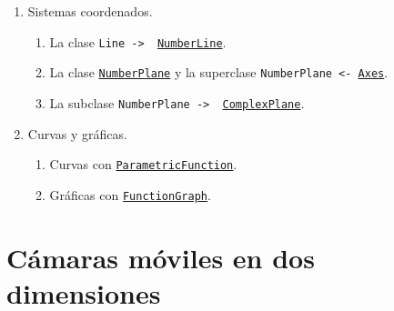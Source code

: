 \documentclass[a4paper]{article}
\begin{document}
\begin{enumerate}
    \item Sistemas coordenados.
    \begin{enumerate}[label=3.\arabic*]

        \item La clase \texttt{Line -> \ \href{https://docs.manim.community/en/v0.16.0.post0/reference/manim.mobject.graphing.number_line.NumberLine.html?highlight=NumberLine}{NumberLine}}.

        \item La clase \texttt{\href{https://docs.manim.community/en/v0.16.0.post0/reference/manim.mobject.graphing.coordinate_systems.NumberPlane.html?highlight=NumberPlane}{NumberPlane}} y la superclase \texttt{NumberPlane <- \href{https://docs.manim.community/en/v0.16.0.post0/reference/manim.mobject.graphing.coordinate_systems.Axes.html?highlight=Axes}{Axes}}.

        \item La subclase \texttt{NumberPlane -> \ \href{https://docs.manim.community/en/v0.16.0.post0/reference/manim.mobject.graphing.coordinate_systems.ComplexPlane.html?highlight=ComplexPlane}{ComplexPlane}}.
    \end{enumerate}

    \item Curvas y gráficas.
    \begin{enumerate}[label=4.\arabic*]

        \item Curvas con \href{https://docs.manim.community/en/v0.16.0.post0/reference/manim.mobject.graphing.functions.ParametricFunction.html#manim.mobject.graphing.functions.ParametricFunction}{\texttt{ParametricFunction}}.

        \item Gráficas con \href{https://docs.manim.community/en/v0.16.0.post0/reference/manim.mobject.graphing.functions.FunctionGraph.html#manim.mobject.graphing.functions.FunctionGraph}{\texttt{FunctionGraph}}.
    \end{enumerate}
\end{enumerate}

\section{Cámaras móviles en dos dimensiones} \label{Sec: Cámaras móviles en dos dimensiones}
\end{document}
